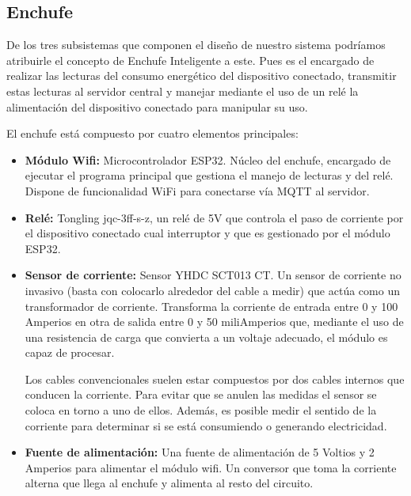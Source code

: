 \documentclass[a4paper,10pt]{article}
\begin{document}
\newpage

\subsection{Enchufe}\label{subsec:enchufe}

De los tres subsistemas que componen el diseño de nuestro sistema
podríamos atribuirle el concepto de Enchufe Inteligente a este. Pues
es el encargado de realizar las lecturas del consumo energético del
dispositivo conectado, transmitir estas lecturas al servidor central y
manejar mediante el uso de un relé la alimentación del dispositivo
conectado para manipular su uso.

El enchufe está compuesto por cuatro elementos principales:

\begin{itemize}
\item{\textbf{Módulo Wifi:} Microcontrolador
  ESP32\cite{ESP32SeriesDatasheet}. Núcleo del enchufe, encargado de
  ejecutar el programa principal que gestiona el manejo de lecturas y
  del relé. Dispone de funcionalidad WiFi para conectarse vía MQTT al
  servidor.}

\item{\textbf{Relé:} Tongling jqc-3ff-s-z, un relé de 5V que controla
  el paso de corriente por el dispositivo conectado cual interruptor y
  que es gestionado por el módulo ESP32.}

\item{\textbf{Sensor de corriente:} Sensor YHDC SCT013 CT. Un
  sensor de corriente no invasivo (basta con colocarlo alrededor del
  cable a medir) que actúa como un transformador de
  corriente. Transforma la corriente de entrada entre 0 y 100 Amperios
  en otra de salida entre 0 y 50 miliAmperios que, mediante el uso de
  una resistencia de carga que convierta a un voltaje adecuado, el
  módulo es capaz de procesar.

  Los cables convencionales suelen estar compuestos por dos cables
  internos que conducen la corriente. Para evitar que se anulen las
  medidas el sensor se coloca en torno a uno de ellos. Además, es
  posible medir el sentido de la corriente para determinar si se está
  consumiendo o generando electricidad.}

\item{\textbf{Fuente de alimentación:} Una fuente de alimentación de
  5 Voltios y 2 Amperios para alimentar el módulo wifi. Un conversor
  que toma la corriente alterna que llega al enchufe y alimenta al
  resto del circuito.}
\end{itemize}
\end{document}
